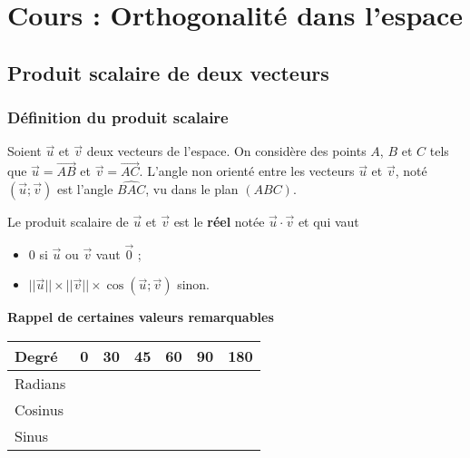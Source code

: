 \documentclass[11pt,fleqn, openany]{book} %
\begin{document}


\chapter{Cours : Orthogonalité dans l'espace}


\section{Produit scalaire de deux vecteurs}


\subsection{Définition du produit scalaire}


\begin{definition}Soient $\vec u$ et $\vec v$ deux vecteurs de l'espace. On considère des points $A$, $B$ et $C$ tels que $\vec u = \overrightarrow{AB}$ et $\vec v= \overrightarrow{AC}$. L'angle non orienté entre les vecteurs $\vec u$ et $\vec v$, noté $(\vec u;\vec v)$ est  l'angle $\widehat{BAC}$, vu dans le plan $(ABC)$.\end{definition}

\begin{definition}Le produit scalaire de $\vec u$ et $\vec v$ est le \textbf{réel} notée $\vec u \cdot \vec v$ et qui vaut
\begin{itemize}
\item 0 si $\vec u$ ou $\vec v$ vaut $\overrightarrow{0}$ ;
\item $\lvert\lvert\vec u\rvert\rvert \times \lvert\lvert\vec v\rvert\rvert \times \cos (\vec u ; \vec v)$ sinon.
\end{itemize}\end{definition}

\textbf{Rappel de certaines valeurs remarquables}

\begin{center}
\renewcommand{\arraystretch}{2.5}
\noindent \begin{tabularx}{0.9\linewidth}{|X|XXXXXX|}
\hline
Degré & 0 & 30 & 45 & 60 & 90 & 180 \\
\hline
Radians &  &  &  &  &  &  \\
\hline
Cosinus &  &  &  &  &  & \\
\hline
Sinus &  &  &  &  & & \\
\hline
\end{tabularx}
\end{center}
\end{document}
